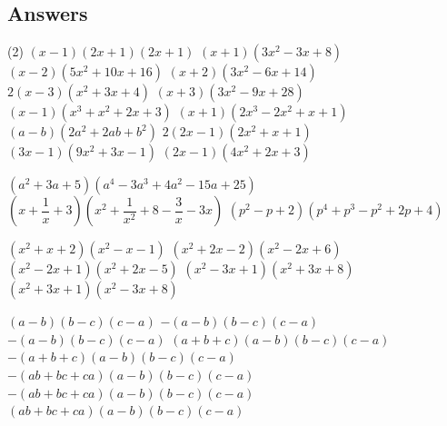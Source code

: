 	\subsection*{Answers}
		\begin{tasks}[label = \arabic*.,label-width = 1.5em](2) %
			\task $(x-1)(2x+1)(2x+1)$
			\task $(x+1)(3x^2-3x+8)$
			\task $(x-2)(5x^2+10x+16)$
			\task $(x+2)(3x^2-6x+14)$
			\task $2(x-3)(x^2+3x+4)$
			\task $(x+3)(3x^2-9x+28)$
			\task $(x-1)(x^3+x^2+2x+3)$
			\task $(x+1)(2x^3-2x^2+x+1)$
			\task $(a-b)(2a^2+2ab+b^2)$
			\task $2(2x-1)(2x^2+x+1)$
			\task $(3x-1)(9x^2+3x-1)$
			\task $(2x-1)(4x^2+2x+3)$



			\task $(a^2+3a+5)(a^4-3a^3+4a^2-15a+25)$
			\task $\left(x+\dfrac{1}{x}+3\right)\left(x^2+\dfrac{1}{x^2}+8-\dfrac{3}{x}-3x\right)$
			\task $(p^2-p+2)(p^4+p^3-p^2+2p+4)$

			\task $(x^2+x+2)(x^2-x-1)$
			\task $(x^2+2x-2)(x^2-2x+6)$
			\task $(x^2-2x+1)(x^2+2x-5)$
			\task $(x^2-3x+1)(x^2+3x+8)$
			\task $(x^2+3x+1)(x^2-3x+8)$


			\task $(a-b)(b-c)(c-a)$
			\task $-(a-b)(b-c)(c-a)$
			\task $-(a-b)(b-c)(c-a)$
			\task $(a+b+c)(a-b)(b-c)(c-a)$
			\task $-(a+b+c)(a-b)(b-c)(c-a)$
			\task $-(ab+bc+ca)(a-b)(b-c)(c-a)$
			\task $-(ab+bc+ca)(a-b)(b-c)(c-a)$
			\task $(ab+bc+ca)(a-b)(b-c)(c-a)$


		\end{tasks}